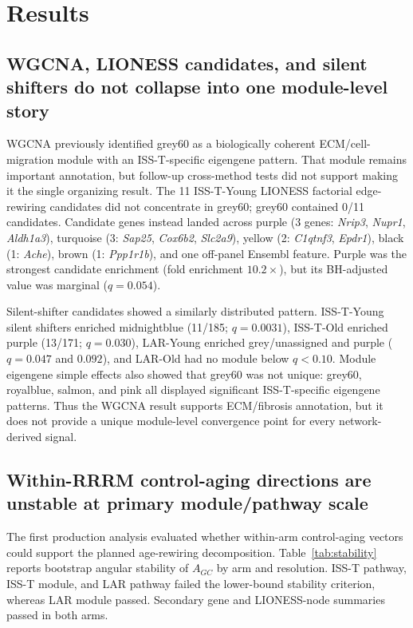 \documentclass[11pt]{article}
\newcommand{\gene}[1]{\textit{#1}}
\begin{document}
\section{Results}

\subsection{WGCNA, LIONESS candidates, and silent shifters do not collapse into one module-level story}

WGCNA previously identified grey60 as a biologically coherent ECM/cell-migration module with an ISS-T-specific eigengene pattern. That module remains important annotation, but follow-up cross-method tests did not support making it the single organizing result. The 11 ISS-T-Young LIONESS factorial edge-rewiring candidates did not concentrate in grey60; grey60 contained 0/11 candidates. Candidate genes instead landed across purple (3 genes: \gene{Nrip3}, \gene{Nupr1}, \gene{Aldh1a3}), turquoise (3: \gene{Sap25}, \gene{Cox6b2}, \gene{Slc2a9}), yellow (2: \gene{C1qtnf3}, \gene{Epdr1}), black (1: \gene{Ache}), brown (1: \gene{Ppp1r1b}), and one off-panel Ensembl feature. Purple was the strongest candidate enrichment (fold enrichment $10.2\times$), but its BH-adjusted value was marginal ($q=0.054$).

Silent-shifter candidates showed a similarly distributed pattern. ISS-T-Young silent shifters enriched midnightblue (11/185; $q=0.0031$), ISS-T-Old enriched purple (13/171; $q=0.030$), LAR-Young enriched grey/unassigned and purple ($q=0.047$ and $0.092$), and LAR-Old had no module below $q<0.10$. Module eigengene simple effects also showed that grey60 was not unique: grey60, royalblue, salmon, and pink all displayed significant ISS-T-specific eigengene patterns. Thus the WGCNA result supports ECM/fibrosis annotation, but it does not provide a unique module-level convergence point for every network-derived signal.

\subsection{Within-RRRM control-aging directions are unstable at primary module/pathway scale}

The first production analysis evaluated whether within-arm control-aging vectors could support the planned age-rewiring decomposition. Table~\ref{tab:stability} reports bootstrap angular stability of $A_{GC}$ by arm and resolution. ISS-T pathway, ISS-T module, and LAR pathway failed the lower-bound stability criterion, whereas LAR module passed. Secondary gene and LIONESS-node summaries passed in both arms.
\end{document}
